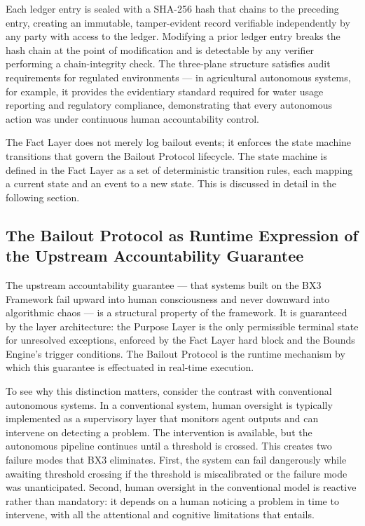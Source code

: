 Each ledger entry is sealed with a SHA-256 hash that chains to the preceding entry, creating an immutable, tamper-evident record verifiable independently by any party with access to the ledger. Modifying a prior ledger entry breaks the hash chain at the point of modification and is detectable by any verifier performing a chain-integrity check. The three-plane structure satisfies audit requirements for regulated environments --- in agricultural autonomous systems, for example, it provides the evidentiary standard required for water usage reporting and regulatory compliance, demonstrating that every autonomous action was under continuous human accountability control.

The Fact Layer does not merely log bailout events; it enforces the state machine transitions that govern the Bailout Protocol lifecycle. The state machine is defined in the Fact Layer as a set of deterministic transition rules, each mapping a current state and an event to a new state. This is discussed in detail in the following section.

\subsection{The Bailout Protocol as Runtime Expression of the Upstream Accountability Guarantee}
\label{sec:runtime-expression}

The upstream accountability guarantee --- that systems built on the BX3 Framework fail upward into human consciousness and never downward into algorithmic chaos --- is a structural property of the framework. It is guaranteed by the layer architecture: the Purpose Layer is the only permissible terminal state for unresolved exceptions, enforced by the Fact Layer hard block and the Bounds Engine's trigger conditions. The Bailout Protocol is the runtime mechanism by which this guarantee is effectuated in real-time execution.

To see why this distinction matters, consider the contrast with conventional autonomous systems. In a conventional system, human oversight is typically implemented as a supervisory layer that monitors agent outputs and can intervene on detecting a problem. The intervention is available, but the autonomous pipeline continues until a threshold is crossed. This creates two failure modes that BX3 eliminates. First, the system can fail dangerously while awaiting threshold crossing if the threshold is miscalibrated or the failure mode was unanticipated. Second, human oversight in the conventional model is reactive rather than mandatory: it depends on a human noticing a problem in time to intervene, with all the attentional and cognitive limitations that entails.

